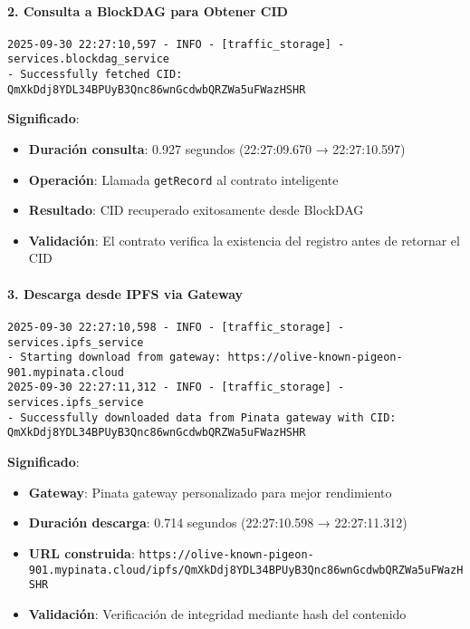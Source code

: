 \documentclass[onecolumn]{article}
\begin{document}
\paragraph{2. Consulta a BlockDAG para Obtener CID}
\begin{verbatim}
2025-09-30 22:27:10,597 - INFO - [traffic_storage] - services.blockdag_service 
- Successfully fetched CID: QmXkDdj8YDL34BPUyB3Qnc86wnGcdwbQRZWa5uFWazHSHR
\end{verbatim}
\textbf{Significado}:
\begin{itemize}
    \item \textbf{Duración consulta}: 0.927 segundos (22:27:09.670 → 22:27:10.597)
    \item \textbf{Operación}: Llamada \texttt{getRecord} al contrato inteligente
    \item \textbf{Resultado}: CID recuperado exitosamente desde BlockDAG
    \item \textbf{Validación}: El contrato verifica la existencia del registro antes de retornar el CID
\end{itemize}

\paragraph{3. Descarga desde IPFS via Gateway}
\begin{verbatim}
2025-09-30 22:27:10,598 - INFO - [traffic_storage] - services.ipfs_service 
- Starting download from gateway: https://olive-known-pigeon-901.mypinata.cloud
2025-09-30 22:27:11,312 - INFO - [traffic_storage] - services.ipfs_service 
- Successfully downloaded data from Pinata gateway with CID: QmXkDdj8YDL34BPUyB3Qnc86wnGcdwbQRZWa5uFWazHSHR
\end{verbatim}
\textbf{Significado}:
\begin{itemize}
    \item \textbf{Gateway}: Pinata gateway personalizado para mejor rendimiento
    \item \textbf{Duración descarga}: 0.714 segundos (22:27:10.598 → 22:27:11.312)
    \item \textbf{URL construida}: \texttt{https://olive-known-pigeon-901.mypinata.cloud/ipfs/QmXkDdj8YDL34BPUyB3Qnc86wnGcdwbQRZWa5uFWazHSHR}
    \item \textbf{Validación}: Verificación de integridad mediante hash del contenido
\end{itemize}
\end{document}
